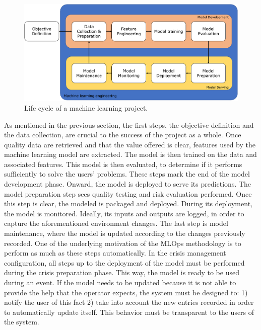 \begin{figure}[htb]
    \centering
    \includegraphics[width=\textwidth]{figures/chap-5/machine-learning-life-cycle.pdf}
    \caption{Life cycle of a machine learning project.}
    \label{system:ml-life-cycle}
\end{figure}

As mentioned in the previous section, the first steps, the objective definition and the data collection, are crucial to the success of the project as a whole.
Once quality data are retrieved and that the value offered is clear, features used by the machine learning model are extracted.
The model is then trained on the data and associated features.
This model is then evaluated, to determine if it performs sufficiently to solve the users' problems.
These steps mark the end of the model development phase.
Onward, the model is deployed to serve its predictions.
The model preparation step sees quality testing and risk evaluation performed.
Once this step is clear, the modeled is packaged and deployed.
During its deployment, the model is monitored.
Ideally, its inputs and outputs are logged, in order to capture the aforementioned environment changes.
The last step is model maintenance, where the model is updated according to the changes previously recorded.
One of the underlying motivation of the MLOps methodology is to perform as much as these steps automatically.
In the crisis management configuration, all steps up to the deployment of the model must be performed during the crisis preparation phase.
This way, the model is ready to be used during an event.
If the model needs to be updated because it is not able to provide the help that the operator expects, the system must be designed to: 1) notify the user of this fact 2) take into account the new entries recorded in order to automatically update itself.
This behavior must be transparent to the users of the system.

